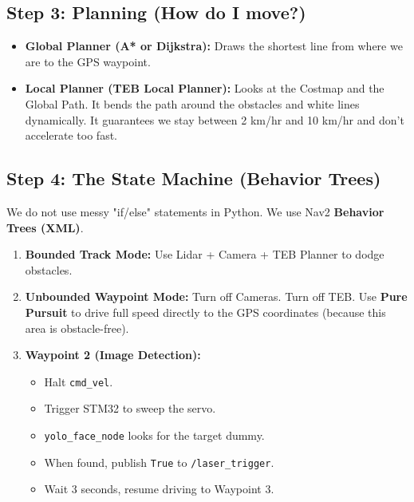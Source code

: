 \documentclass[12pt, a4paper]{article}
\begin{document}
\subsection{Step 3: Planning (How do I move?)}
\begin{itemize}
    \item \textbf{Global Planner (A* or Dijkstra):} Draws the shortest line from where we are to the GPS waypoint.
    \item \textbf{Local Planner (TEB Local Planner):} Looks at the Costmap and the Global Path. It bends the path around the obstacles and white lines dynamically. It guarantees we stay between 2 km/hr and 10 km/hr and don't accelerate too fast.
\end{itemize}

\subsection{Step 4: The State Machine (Behavior Trees)}
We do not use messy "if/else" statements in Python. We use Nav2 \textbf{Behavior Trees (XML)}.
\begin{enumerate}
    \item \textbf{Bounded Track Mode:} Use Lidar + Camera + TEB Planner to dodge obstacles.
    \item \textbf{Unbounded Waypoint Mode:} Turn off Cameras. Turn off TEB. Use \textbf{Pure Pursuit} to drive full speed directly to the GPS coordinates (because this area is obstacle-free).
    \item \textbf{Waypoint 2 (Image Detection):} 
    \begin{itemize}
        \item Halt \texttt{cmd\_vel}.
        \item Trigger STM32 to sweep the servo.
        \item \texttt{yolo\_face\_node} looks for the target dummy.
        \item When found, publish \texttt{True} to \texttt{/laser\_trigger}.
        \item Wait 3 seconds, resume driving to Waypoint 3.
    \end{itemize}
\end{enumerate}
\end{document}
